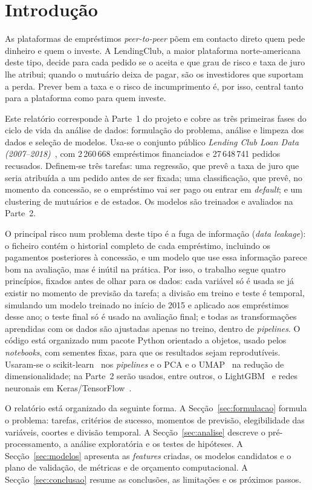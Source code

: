 \section{Introdução}
\label{sec:introducao}

As plataformas de empréstimos \textit{peer-to-peer} põem em contacto direto quem pede dinheiro e quem o investe. A LendingClub, a maior plataforma norte-americana deste tipo, decide para cada pedido se o aceita e que grau de risco e taxa de juro lhe atribui; quando o mutuário deixa de pagar, são os investidores que suportam a perda. Prever bem a taxa e o risco de incumprimento é, por isso, central tanto para a plataforma como para quem investe.

Este relatório corresponde à Parte~1 do projeto e cobre as três primeiras fases do ciclo de vida da análise de dados: formulação do problema, análise e limpeza dos dados e seleção de modelos. Usa-se o conjunto público \textit{Lending Club Loan Data (2007--2018)}~\cite{kaggle}, com 2\,260\,668 empréstimos financiados e 27\,648\,741 pedidos recusados. Definem-se três tarefas: uma regressão, que prevê a taxa de juro que seria atribuída a um pedido antes de ser fixada; uma classificação, que prevê, no momento da concessão, se o empréstimo vai ser pago ou entrar em \textit{default}; e um clustering de mutuários e de estados. Os modelos são treinados e avaliados na Parte~2.

O principal risco num problema deste tipo é a fuga de informação (\textit{data leakage}): o ficheiro contém o historial completo de cada empréstimo, incluindo os pagamentos posteriores à concessão, e um modelo que use essa informação parece bom na avaliação, mas é inútil na prática. Por isso, o trabalho segue quatro princípios, fixados antes de olhar para os dados: cada variável só é usada se já existir no momento de previsão da tarefa; a divisão em treino e teste é temporal, simulando um modelo treinado no início de 2015 e aplicado aos empréstimos desse ano; o teste final só é usado na avaliação final; e todas as transformações aprendidas com os dados são ajustadas apenas no treino, dentro de \textit{pipelines}. O código está organizado num pacote Python orientado a objetos, usado pelos \textit{notebooks}, com sementes fixas, para que os resultados sejam reprodutíveis. Usaram-se o scikit-learn~\cite{sklearn} nos \textit{pipelines} e o PCA e o UMAP~\cite{umap} na redução de dimensionalidade; na Parte~2 serão usados, entre outros, o LightGBM~\cite{lightgbm} e redes neuronais em Keras/TensorFlow~\cite{geron}.

O relatório está organizado da seguinte forma. A Secção~\ref{sec:formulacao} formula o problema: tarefas, critérios de sucesso, momentos de previsão, elegibilidade das variáveis, coortes e divisão temporal. A Secção~\ref{sec:analise} descreve o pré-processamento, a análise exploratória e os testes de hipóteses. A Secção~\ref{sec:modelos} apresenta as \textit{features} criadas, os modelos candidatos e o plano de validação, de métricas e de orçamento computacional. A Secção~\ref{sec:conclusao} resume as conclusões, as limitações e os próximos passos.